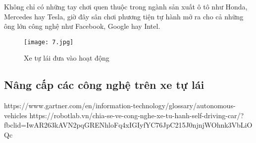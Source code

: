 \documentclass[18pt]{article}
\begin{document}
Không chỉ có những tay chơi quen thuộc trong ngành sản xuất ô tô như Honda, Mercedes hay Tesla, giờ đây sân chơi phương tiện tự hành mở ra cho cả những ông lớn công nghệ như Facebook, Google hay Intel.
\begin{figure}[h]
\centering 
\texttt{[image: 7.jpg]} 
\caption{Xe tự lái đưa vào hoạt động} 
\label{dinhnghia} 
\end{figure}

\subsection{Nâng cấp các công nghệ trên xe tự lái}
\newpage
\begin{thebibliography}{9}
https://www.gartner.com/en/information-technology/glossary/autonomous-vehicles
https://robotlab.vn/chia-se-ve-cong-nghe-xe-tu-hanh-self-driving-car/?fbclid=IwAR263kAVN2pqGRENhloFq4xIGIyfYC76JpC215J0njnjWOhnk3VbLiOQc


\end{thebibliography}
 
\end{document}

